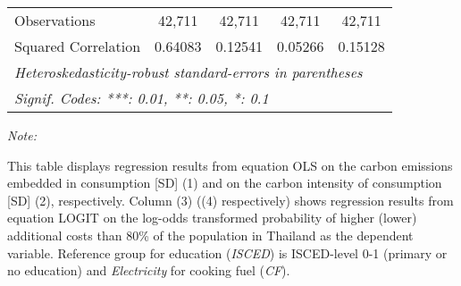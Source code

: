 \begin{table}[htbp!]
\begin{adjustbox}{width = 1\textwidth, max height = 0.95\textheight, center}
\begin{threeparttable}[b]
\begin{tabular}{lcccc}
            Observations         & 42,711             & 42,711             & 42,711         & 42,711\\  
            Squared Correlation  & 0.64083            & 0.12541            & 0.05266        & 0.15128\\  
            \midrule \midrule
            \multicolumn{5}{l}{\emph{Heteroskedasticity-robust standard-errors in parentheses}}\\
            \multicolumn{5}{l}{\emph{Signif. Codes: ***: 0.01, **: 0.05, *: 0.1}}\\
         \end{tabular}
         
         \begin{tablenotes}\item \medskip \textit{Note:}
            \item This table displays regression results from equation OLS on the carbon emissions embedded in consumption [SD] (1) and on the carbon intensity of consumption [SD] (2), respectively. 
                                      Column (3) ((4) respectively) shows regression results from equation LOGIT on the log-odds transformed probability of higher (lower) additional costs than 80\% of the population in Thailand as the dependent variable. Reference group for education (\textit{ISCED}) is ISCED-level 0-1 (primary or no education) and \textit{Electricity} for cooking fuel (\textit{CF}).
         \end{tablenotes}
      \end{threeparttable}
   \end{adjustbox}
\end{table}


